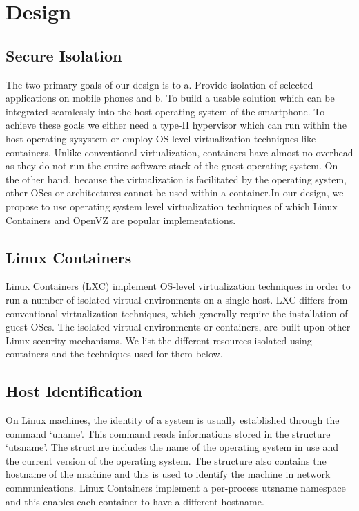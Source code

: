 \section{Design}
\label{sec:design}

\subsection{Secure Isolation}
The two primary goals of our design is to a. Provide isolation of selected applications on mobile phones and b. To build a usable solution which can be integrated seamlessly into the host operating system of the smartphone. To achieve these goals we either need a type-II hypervisor which can run within the host operating sysystem or employ OS-level virtualization techniques like containers.  Unlike conventional virtualization, containers have almost no overhead as they do not run the entire software stack of the guest operating system.  On the other hand, because the virtualization is facilitated by the operating system, other OSes or architectures cannot be used within a container.In our design, we propose to use operating system level virtualization techniques of which Linux Containers and OpenVZ are popular implementations.\\
 
\subsection{Linux Containers}
Linux Containers (LXC) implement OS-level virtualization techniques in order to run a number of isolated virtual environments on a single host.  LXC differs from conventional virtualization techniques, which generally require the installation of guest OSes.  The isolated virtual environments or containers, are built upon other Linux security mechanisms. We list the different resources isolated using containers and the techniques used for them below.



\subsection{Host Identification}
On Linux machines, the identity of a system is usually established through the command `uname'. This command reads informations stored in the structure `utsname'. The structure includes the name of the operating system in use and the current version of the operating system. The structure also contains the hostname of the machine and this is used to identify the machine in network communications. Linux Containers implement a per-process utsname namespace and this enables each container to have a different hostname.

